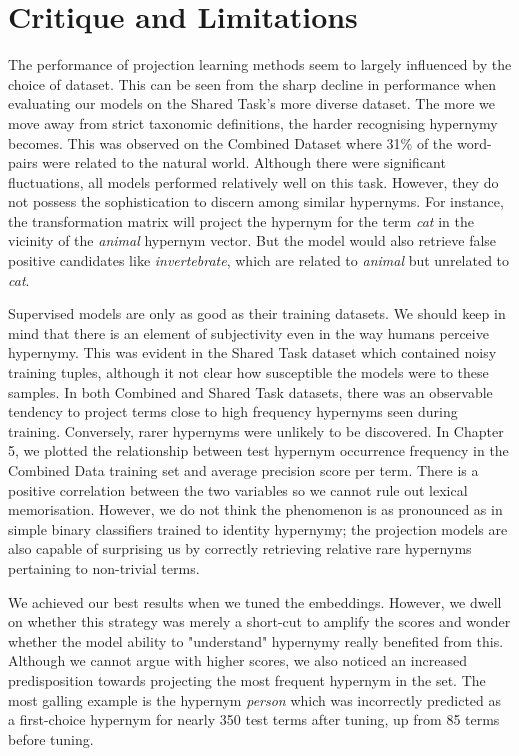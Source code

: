\section{Critique and Limitations}
The performance of projection learning methods seem to largely influenced by the choice of dataset.  This can be seen from the sharp decline in performance when evaluating our models on the Shared Task's more diverse dataset.  The more we move away from strict taxonomic definitions, the harder recognising hypernymy becomes.  This was observed on the Combined Dataset where 31\% of the word-pairs were related to the natural world.  Although there were significant fluctuations, all models performed relatively well on this task.  However, they do not possess the sophistication to discern among similar hypernyms.  For instance, the transformation matrix will project the hypernym for the term \textit{cat} in the vicinity of the \textit{animal} hypernym vector. But the model would also retrieve false positive candidates like \textit{invertebrate}, which are related to \textit{animal} but unrelated to \textit{cat}.

Supervised models are only as good as their training datasets.  We should keep in mind that there is an element of subjectivity even in the way humans perceive hypernymy.  This was evident in the Shared Task dataset which contained noisy training tuples, although it not clear how susceptible the models were to these samples.  In both Combined and Shared Task datasets, there was an observable tendency to project terms close to high frequency hypernyms seen during training.  Conversely, rarer hypernyms were unlikely to be discovered.  In Chapter 5, we plotted the relationship between test hypernym occurrence frequency in the Combined Data training set and average precision score per term.  There is a positive correlation between the two variables so we cannot rule out lexical memorisation.  However, we do not think the phenomenon is as pronounced as in simple binary classifiers trained to identity hypernymy; the projection models are also capable of surprising us by correctly retrieving relative rare hypernyms pertaining to non-trivial terms.

We achieved our best results when we tuned the embeddings.  However, we dwell on whether this strategy was merely a short-cut to amplify the scores and wonder whether the model ability to "understand" hypernymy really benefited from this.  Although we cannot argue with higher scores, we also noticed an increased predisposition towards projecting the most frequent hypernym in the set.  The most galling example is the hypernym \textit{person} which was incorrectly predicted as a first-choice hypernym for nearly 350 test terms after tuning, up from 85 terms before tuning.

